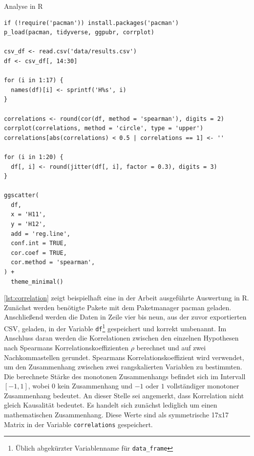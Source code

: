 \begin{listing}[H]
  \caption{Analyse in R}
  \label{lst:correlation}
  \begin{verbatim}
if (!require('pacman')) install.packages('pacman')
p_load(pacman, tidyverse, ggpubr, corrplot)

csv_df <- read.csv('data/results.csv')
df <- csv_df[, 14:30]

for (i in 1:17) {
  names(df)[i] <- sprintf('H%s', i)
}

correlations <- round(cor(df, method = 'spearman'), digits = 2)
corrplot(correlations, method = 'circle', type = 'upper')
correlations[abs(correlations) < 0.5 | correlations == 1] <- ''

for (i in 1:20) {
  df[, i] <- round(jitter(df[, i], factor = 0.3), digits = 3)
}

ggscatter(
  df,
  x = 'H11',
  y = 'H12',
  add = 'reg.line',
  conf.int = TRUE,
  cor.coef = TRUE,
  cor.method = 'spearman',
) +
  theme_minimal()
\end{verbatim}
\end{listing}

\autoref{lst:correlation} zeigt beispielhaft eine in der Arbeit ausgeführte Auswertung in R.
Zunächst werden benötigte Pakete mit dem Paketmanager pacman\cite{rdoc-pacman} geladen.
Anschließend werden die Daten in Zeile vier bis neun, aus der zuvor exportierten \ac{CSV}, geladen, in der Variable \texttt{df}\footnote{Üblich abgekürzter Variablenname für \texttt{data\_frame}} gespeichert und korrekt umbenannt.
Im Anschluss daran werden die Korrelationen zwischen den einzelnen Hypothesen nach Spearmans Korrelationskoeffizienten $\rho$ berechnet und auf zwei Nachkommastellen gerundet.
Spearmans Korrelationskoeffizient wird verwendet, um den Zusammenhang zwischen zwei rangskalierten Variablen zu bestimmten\cite{statistik-datenanalyse}.
Die berechnete Stärke des monotonen Zusammenhangs befindet sich im Intervall $[-1, 1]$, wobei $0$ kein Zusammenhang und $-1$ oder $1$ vollständiger monotoner Zusammenhang bedeutet.
An dieser Stelle sei angemerkt, dass Korrelation nicht gleich Kausalität bedeutet\cite[S.64]{elementare-stochastik}.
Es handelt sich zunächst lediglich um einen mathematischen Zusammenhang.
Diese Werte sind als symmetrische 17x17 Matrix in der Variable \texttt{correlations} gespeichert. \\

